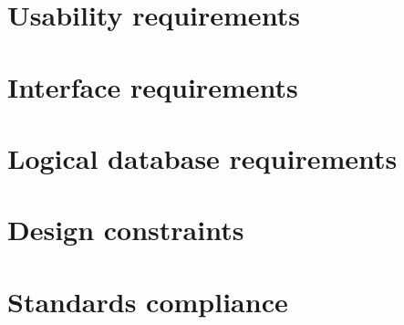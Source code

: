 \section{Usability requirements}


\section{Interface requirements}



\section{Logical database requirements}



\section{Design constraints}

\section{Standards compliance}

